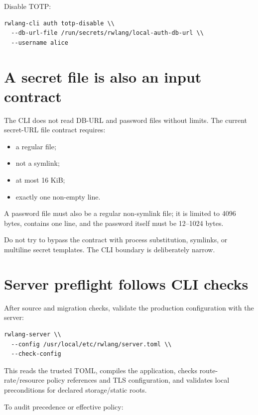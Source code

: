 Disable TOTP:

\begin{lstlisting}
rwlang-cli auth totp-disable \\
  --db-url-file /run/secrets/rwlang/local-auth-db-url \\
  --username alice
\end{lstlisting}

\section{A secret file is also an input contract}

The CLI does not read DB-URL and password files without limits. The current secret-URL file contract requires:

\begin{itemize}
  \item a regular file;
  \item not a symlink;
  \item at most 16 KiB;
  \item exactly one non-empty line.
\end{itemize}

A password file must also be a regular non-symlink file; it is limited to 4096 bytes, contains one line, and the password itself must be 12--1024 bytes.

Do not try to bypass the contract with process substitution, symlinks, or multiline secret templates. The CLI boundary is deliberately narrow.

\section{Server preflight follows CLI checks}

After source and migration checks, validate the production configuration with the server:

\begin{lstlisting}
rwlang-server \\
  --config /usr/local/etc/rwlang/server.toml \\
  --check-config
\end{lstlisting}

This reads the trusted TOML, compiles the application, checks route-rate/resource policy references and TLS configuration, and validates local preconditions for declared storage/static roots.

To audit precedence or effective policy:

